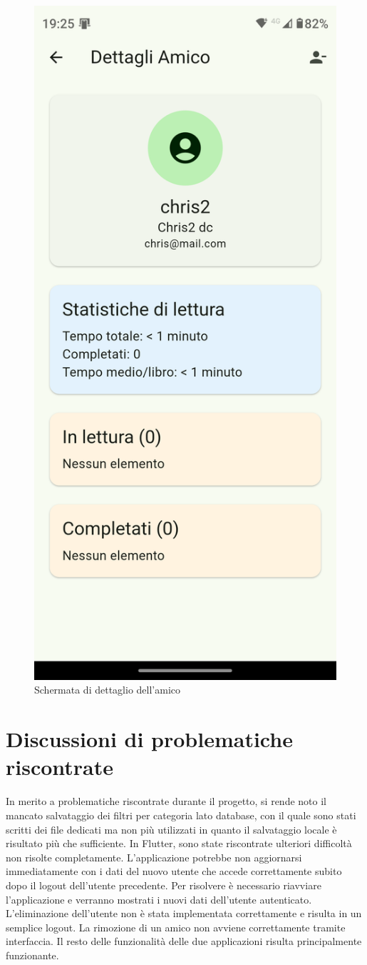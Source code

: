 \documentclass{article}
\begin{document}
\begin{figure}[H]
  \centering
  \includegraphics[width=0.6\linewidth]{friend-screen-f.png}
  \caption{Schermata di dettaglio dell'amico}
  \label{fig:sitemap}
\end{figure}

\section{Discussioni di problematiche riscontrate}
In merito a problematiche riscontrate durante il progetto, si rende noto il mancato salvataggio dei filtri per categoria lato database, con il quale sono stati scritti dei file dedicati ma non più utilizzati
in quanto il salvataggio locale è risultato più che sufficiente. In Flutter, sono state riscontrate ulteriori difficoltà non risolte completamente. L'applicazione potrebbe non aggiornarsi immediatamente con i dati del nuovo utente che accede correttamente subito dopo il logout dell'utente precedente.
Per risolvere è necessario riavviare l'applicazione e verranno mostrati i nuovi dati dell'utente autenticato. L'eliminazione dell'utente non è stata implementata correttamente e risulta in un semplice logout.
La rimozione di un amico non avviene correttamente tramite interfaccia. Il resto delle funzionalità delle due applicazioni risulta principalmente funzionante.
\end{document}
